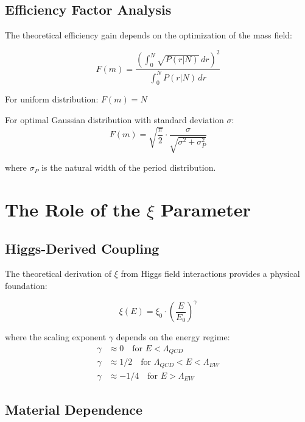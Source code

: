 \documentclass[12pt,a4paper]{article}
\begin{document}
	\subsection{Efficiency Factor Analysis}
	
	The theoretical efficiency gain depends on the optimization of the mass field:
	
	\begin{equation}
		F(m) = \frac{\left(\int_0^N \sqrt{P(r|N)} \, dr\right)^2}{\int_0^N P(r|N) \, dr}
	\end{equation}
	
	For uniform distribution: $F(m) = N$
	
	For optimal Gaussian distribution with standard deviation $\sigma$:
	\begin{equation}
		F(m) = \sqrt{\frac{\pi}{2}} \cdot \frac{\sigma}{\sqrt{\sigma^2 + \sigma_P^2}}
	\end{equation}
	
	where $\sigma_P$ is the natural width of the period distribution.
	
	\section{The Role of the $\xi$ Parameter}
	
	\subsection{Higgs-Derived Coupling}
	
	The theoretical derivation of $\xi$ from Higgs field interactions provides a physical foundation:
	
	\begin{equation}
		\xi(E) = \xi_0 \cdot \left(\frac{E}{E_0}\right)^{\gamma}
	\end{equation}
	
	where the scaling exponent $\gamma$ depends on the energy regime:
	\begin{align}
		\gamma &\approx 0 \quad \text{for } E < \Lambda_{QCD} \\
		\gamma &\approx 1/2 \quad \text{for } \Lambda_{QCD} < E < \Lambda_{EW} \\
		\gamma &\approx -1/4 \quad \text{for } E > \Lambda_{EW}
	\end{align}
	
	\subsection{Material Dependence}
	
\end{document}
